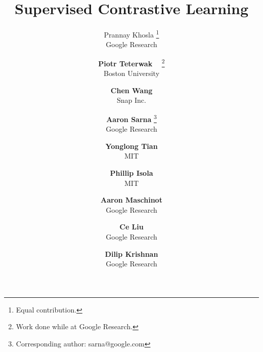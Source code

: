 \documentclass[10pt,letterpaper]{article}
\begin{document}
\title{Supervised Contrastive Learning}


{ 
\author{\small Prannay Khosla \thanks{\scriptsize Equal contribution.} \\
{\small Google Research}
\and
{\small \textbf{Piotr Teterwak} \footnotemark[1]\ \  \thanks{\scriptsize Work done while at Google Research.}}\\
{\small Boston University} \\
\and
{\small \textbf{Chen Wang} \footnotemark[2]} \\
{\small Snap Inc.} \\
\and
{\small \textbf{Aaron Sarna} \thanks{\scriptsize Corresponding author: sarna@google.com}} \\
{\small Google Research} \\
\and
{\small \textbf{Yonglong Tian}} \footnotemark[2]\\
{\small MIT} \\
\and
{\small \textbf{Phillip Isola}} \footnotemark[2]\\ 
{\small MIT} \\
\and
{\small \textbf{Aaron Maschinot}} \\
{\small Google Research}\\
\and
{\small \textbf{Ce Liu}} \\
{\small Google Research} \\
\and
{\small \textbf{Dilip Krishnan}} \\
{\small Google Research}\\
}
}
\end{document}
